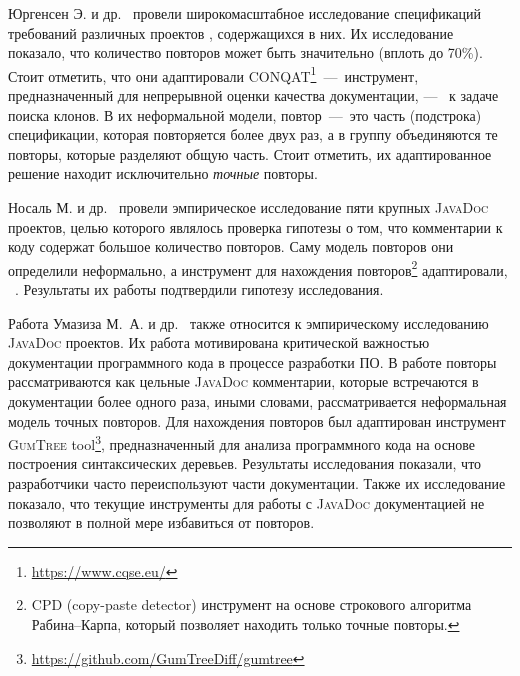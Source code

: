 Юргенсен Э. и др.~\cite{juergens2010can} провели широкомасштабное исследование спецификаций требований различных проектов , содержащихся в них. 
Их исследование показало, что количество повторов может быть значительно (вплоть до 70\%). 
Стоит отметить, что они адаптировали \textsc{CONQAT}\footnote{\url{https://www.cqse.eu/}}~---~инструмент, предназначенный для непрерывной оценки качества документации, ---~ к задаче поиска клонов.
В их неформальной модели, повтор~---~это часть (подстрока) спецификации, которая повторяется более двух раз, а в группу объединяются те повторы, которые разделяют общую часть.
Стоит отметить, их адаптированное решение находит исключительно \emph{точные} повторы.

Носаль М. и др.~\cite{poruban2016preliminary} провели эмпирическое исследование пяти крупных \textsc{JavaDoc} проектов, целью которого являлось проверка гипотезы о том, что комментарии к коду содержат большое количество повторов.
Саму модель повторов они определили неформально, а инструмент для нахождения повторов\footnote{\textsc{CPD} (copy-paste detector) инструмент на основе строкового алгоритма Рабина--Карпа, который позволяет находить только точные повторы.} адаптировали, ~\cite{juergens2010can}.
Результаты их работы подтвердили гипотезу исследования. 

Работа Умазиза М.\, А. и др.~\cite{oumaziz2017documentation} также относится к эмпирическому исследованию \textsc{JavaDoc} проектов. 
Их работа мотивирована критической важностью документации программного кода в процессе разработки ПО.
В работе повторы рассматриваются как цельные \textsc{JavaDoc} комментарии, которые встречаются в документации более одного раза, иными словами, рассматривается неформальная модель точных повторов.
Для нахождения повторов был адаптирован инструмент \textsc{GumTree} tool\footnote{\url{https://github.com/GumTreeDiff/gumtree}}, предназначенный для анализа программного кода на основе построения синтаксических деревьев.
Результаты исследования показали, что разработчики часто переиспользуют части документации.
Также их исследование показало, что текущие инструменты для работы с \textsc{JavaDoc} документацией не позволяют в полной мере избавиться от повторов.


